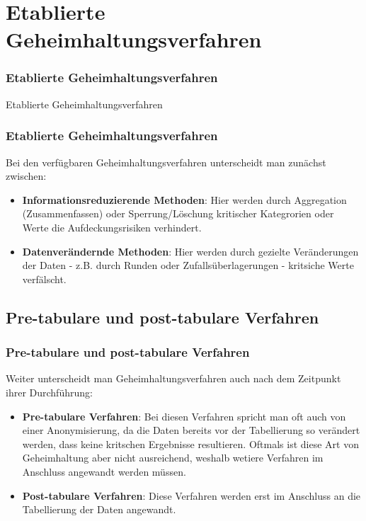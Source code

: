 \documentclass[aspectratio=169]{beamer}
\begin{document}
\section{Etablierte Geheimhaltungsverfahren}

\begin{frame}{}
	\frametitle{Etablierte Geheimhaltungsverfahren}
    \begin{center}
        \huge Etablierte Geheimhaltungsverfahren
    \end{center}
\end{frame}


\begin{frame}
    \frametitle{Etablierte Geheimhaltungsverfahren}
    Bei den verfügbaren Geheimhaltungsverfahren unterscheidt man zunächst zwischen:
    \begin{itemize}
        \item \textbf{Informationsreduzierende Methoden}: Hier werden durch Aggregation (Zusammenfassen) oder Sperrung/Löschung kritischer Kategrorien oder Werte die Aufdeckungsrisiken verhindert.
        \item \textbf{Datenverändernde Methoden}: Hier werden durch gezielte Veränderungen der Daten - z.B. durch Runden oder Zufallsüberlagerungen - kritsiche Werte verfälscht.
    \end{itemize}
\end{frame}


\subsection{Pre-tabulare und post-tabulare Verfahren}

\begin{frame}
    \frametitle{Pre-tabulare und post-tabulare Verfahren}
    Weiter unterscheidt man Geheimhaltungsverfahren auch nach dem Zeitpunkt ihrer Durchführung:
    \begin{itemize}
        \item \textbf{Pre-tabulare Verfahren}: Bei diesen Verfahren spricht man oft auch von einer Anonymisierung, da die Daten bereits vor der Tabellierung so verändert werden, dass keine kritschen Ergebnisse resultieren. Oftmals ist diese Art von Geheimhaltung aber nicht ausreichend, weshalb wetiere Verfahren im Anschluss angewandt werden müssen.
        \item \textbf{Post-tabulare Verfahren}: Diese Verfahren werden erst im Anschluss an die Tabellierung der Daten angewandt.
    \end{itemize}
\end{frame}
\end{document}
